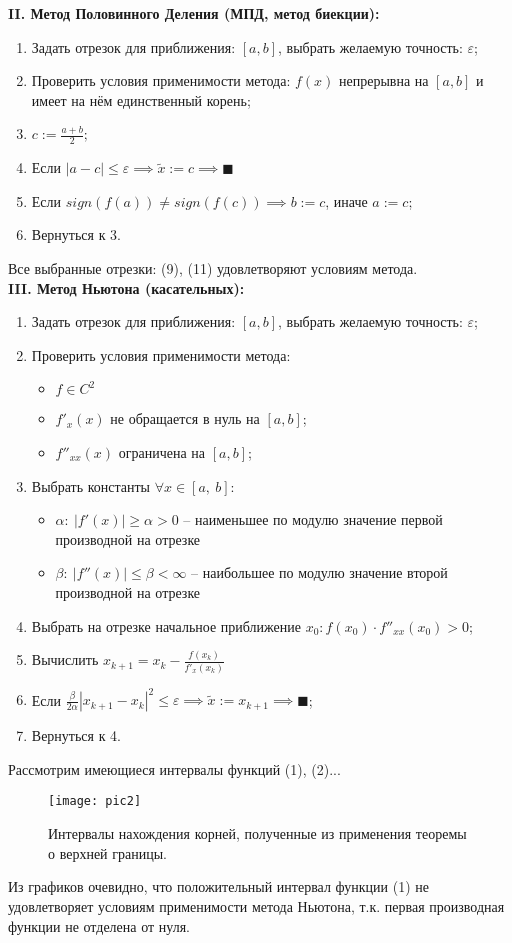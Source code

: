 {\large\bf{II. Метод  Половинного Деления (МПД, метод биекции):}}
\begin{enumerate}
    \item Задать отрезок для приближения: $[a, b]$, выбрать желаемую точность: $\varepsilon$;
    \item Проверить условия применимости метода: $f(x)$ непрерывна на $[a, b]$ и имеет на нём единственный корень;
    \item $c:=\frac{a+b}{2};$
    \item Если $|a-c|\le\varepsilon\implies \widetilde{x}:=c\implies\blacksquare$
    \item Если $sign(f(a)) \ne sign(f(c))\implies b:=c$, иначе $a:=c$;
    \item Вернуться к 3.
\end{enumerate}
Все выбранные отрезки: (9), (11) удовлетворяют условиям метода.\\

{\large\bf{III. Метод  Ньютона (касательных):}}
\begin{enumerate}
    \item Задать отрезок для приближения: $[a, b]$, выбрать желаемую точность: $\varepsilon$;
    \item Проверить условия применимости метода:
        \begin{itemize}
            \item $f \in C^2$
            \item $f'_x(x)$ не обращается в нуль на $[a, b]$;
            \item $f''_{xx}(x)$ ограничена на $[a, b]$;
        \end{itemize}
    \item Выбрать константы $\forall x \in [a,~ b]$:
        \begin{itemize}
            \item $\alpha: ~ |f'(x)|\ge\alpha>0$ -- наименьшее по модулю значение первой производной на отрезке
            \item $\beta: ~ |f''(x)|\le\beta<\infty$  -- наибольшее по модулю значение второй производной на отрезке
        \end{itemize}
    \item Выбрать на отрезке начальное приближение $x_0: f(x_0)\cdot f''_{xx}(x_0) > 0$;
    \item Вычислить $x_{k+1}=x_k-\frac{f(x_k)}{f'_x(x_k)}$
    \item Если $\frac{\beta}{2\alpha}|x_{k+1}-x_k|^2\le\varepsilon
    \implies \widetilde{x}:=x_{k+1}\implies\blacksquare$;
    \item Вернуться к 4.
\end{enumerate}
Рассмотрим имеющиеся интервалы функций (1), (2)...
\begin{figure}[H]
    \centering
    \caption{Интервалы нахождения корней, полученные из применения теоремы о верхней границы.}
    \label{fig:pic2}
    \texttt{[image: pic2]}
\end{figure}
Из графиков очевидно, что положительный интервал функции (1) не удовлетворяет условиям применимости метода Ньютона, т.к. первая производная функции не отделена от нуля.

